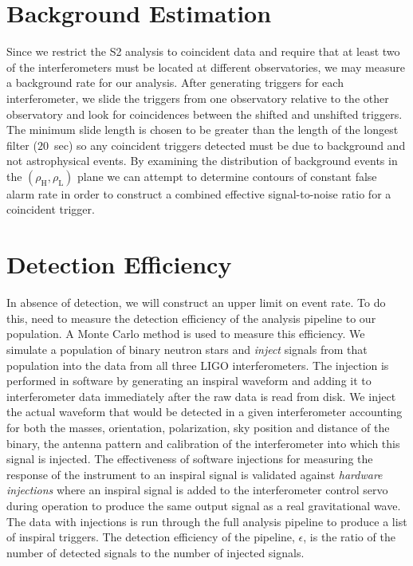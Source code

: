 \section{Background Estimation}
\label{s:background}

Since we restrict the S2 analysis to coincident data and require that at least
two of the interferometers must be located at different observatories, we may
measure a background rate for our analysis. After generating triggers for each
interferometer, we slide the triggers from one observatory relative to the
other observatory and look for coincidences between the shifted and unshifted
triggers. The minimum slide length is chosen to be greater than the length of
the longest filter ($20$~sec) so any coincident triggers detected must be due to background and
not astrophysical events. By examining the distribution of background events
in the $(\rho_\mathrm{H},\rho_\mathrm{L})$ plane we can attempt to determine
contours of constant false alarm rate in order to construct a combined
effective signal-to-noise ratio for a coincident trigger\cite{abbott2004a}.

\section{Detection Efficiency}
\label{s:eff}

In absence of detection, we will construct an upper limit on event rate.  To
do this, need to measure the detection efficiency of the analysis pipeline to
our population. A Monte Carlo method is used to measure this efficiency. We
simulate a population of binary neutron stars and \emph{inject} signals from
that population into the data from all three LIGO interferometers. The
injection is performed in software by generating an inspiral waveform and
adding it to interferometer data immediately after the raw data is read from
disk. We inject the actual waveform that would be detected in a given
interferometer accounting for both the masses, orientation, polarization, sky
position and distance of the binary, the antenna pattern and calibration of
the interferometer into which this signal is injected.  The effectiveness of
software injections for measuring the response of the instrument to an
inspiral signal is validated against \emph{hardware injections}\cite{hw} where
an inspiral signal is added to the interferometer control servo during
operation to produce the same output signal as a real gravitational wave.  The
data with injections is run through the full analysis pipeline to produce a
list of inspiral triggers. The detection efficiency of the pipeline,
$\epsilon$, is the ratio of the number of detected signals to the number of
injected signals.
